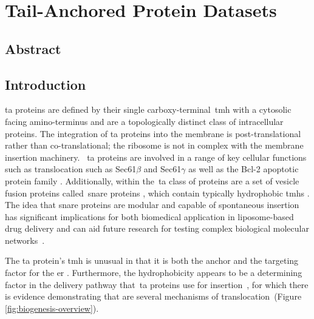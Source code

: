 \chapter{Tail-Anchored Protein Datasets}
\sloppy

\section{Abstract}

\section{Introduction}

\gls{ta} proteins are defined by their single carboxy-terminal~\gls{tmh} with a cytosolic facing amino-terminus and are a topologically distinct class of intracellular proteins.
The integration of \gls{ta} proteins into the membrane is post-translational rather than co-translational; the ribosome is not in complex with the membrane insertion machinery.
~\gls{ta} proteins are involved in a range of key cellular functions such as translocation \cite{Osborne2005} such as Sec61$\beta$ and Sec61$\gamma$ as well as the Bcl-2 apoptotic protein family  \cite{Hockenbery1990}.
Additionally, within the~\gls{ta} class of proteins are a set of vesicle fusion proteins called~\gls{snare} proteins \cite{Ungar2003}, which     contain typically hydrophobic \gls{tmh}s \cite{Kalbfleisch2007}.
The idea that \gls{snare} proteins are modular and capable of spontaneous insertion has significant implications for both biomedical application in liposome\--based drug delivery and can aid future research for testing complex biological molecular networks~\cite{Allen2013, Nordlund2014}.

The \gls{ta} protein's \gls{tmh} is unusual in that it is both the anchor and the targeting factor for the \gls{er} \cite{Kutay1993}.
Furthermore, the hydrophobicity appears to be a determining factor in the delivery pathway that~\gls{ta} proteins use for insertion~\cite{Rabu2008, Rabu2009}, for which there is evidence demonstrating that are several mechanisms of translocation~\cite{Rabu2009, Johnson2013}(Figure \ref{fig:biogenesis-overview}).

